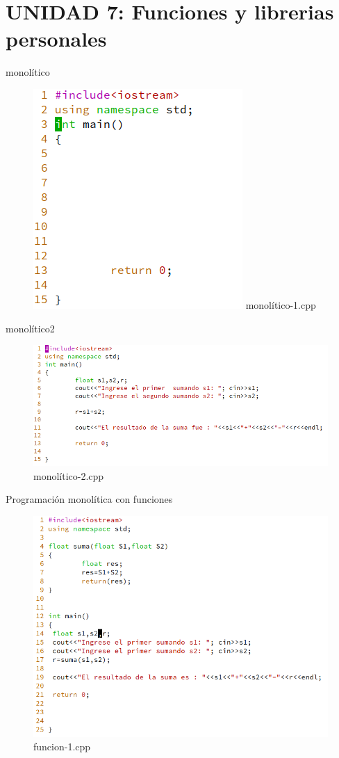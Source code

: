 \documentclass[presentation, aspectratio=54]{beamer}
\begin{document}
\section{UNIDAD 7: Funciones y librerias personales}
\label{sec:orgd700567}
\begin{frame}[label={sec:orgf2d9ac3}]{monolítico}
\begin{figure}[htbp]
\centering
\includegraphics[width=0.5\linewidth]{./images/codigo/monolitico-1.png}
monolítico-1.cpp
\end{figure}
\end{frame}
\begin{frame}[label={sec:org61122a7}]{monolítico2}
\begin{figure}[htbp]
\centering
\includegraphics[width=1.1\linewidth]{./images/codigo/monolitico-2.png}
monolítico-2.cpp
\end{figure}
\end{frame}
\begin{frame}[label={sec:orge1e38bd}]{Programación monolítica con funciones}
\begin{figure}[htbp]
\centering
\includegraphics[width=.9\linewidth]{./images/codigo/funcion1.png}
funcion-1.cpp
\end{figure}
\end{frame}
\end{document}
